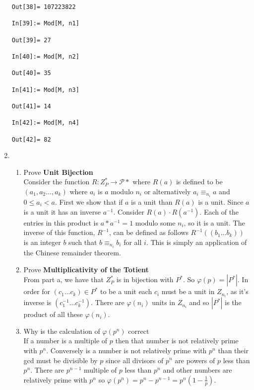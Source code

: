 \documentclass[12pt]{amsart}
\theoremstyle{definition}
\newcommand{\mc}[1]{\mathcal{#1}}
\begin{document}
\begin{enumerate}
\begin{verbatim}
Out[38]= 107223822

In[39]:= Mod[M, n1]

Out[39]= 27

In[40]:= Mod[M, n2]

Out[40]= 35

In[41]:= Mod[M, n3]

Out[41]= 14

In[42]:= Mod[M, n4]

Out[42]= 82
\end{verbatim}


\newpage %
\item 
\begin{enumerate}
\item Prove {\bfseries Unit Bijection}
\\

	Consider the function $R\colon Z_P^*\to \mc{P}*$ where $R(a)$ is defined to be $(a_1,a_2...,a_k)$ where $a_i$ is $a$ modulo $n_i$ or alternatively $a_i \equiv_{n_i} a$ and $0 \leq a_i < a$.
	First we show that if $a$ is a unit than $R(a)$ is a unit. Since $a$ is a unit it has an inverse $a^{-1}$. Consider $R(a)\cdot R(a^{-1})$. Each of the entries in this product is $a*a^{-1}=1$ modulo some $n_i$, so it is a unit. 
	The inverse of this function, $R^{-1}$, can be defined as follows $R^{-1}((b_1...b_k))$ is an integer $b$ such that $b \equiv_{n_i} b_i$ for all $i$. This is simply an application of the Chinese remainder theorem.    
\\
\item Prove {\bfseries Multiplicativity of the Totient}
\\
From part a, we have that $Z_P^*$ is in bijection with $P^*$. So $\varphi(p)=|P^*|$. In order for $(c_1...c_k) \in P^*$ to be a unit each $c_i$ must be a unit in $Z_{n_i}$, as it's inverse is $(c^{-1}_1...c^{-1}_k)$. There are $\varphi(n_i)$ units in $Z_{n_i}$ and so $|P^*|$ is the product of all these $\varphi(n_i)$.
\\
\item Why is the calculation of $\varphi(p^n)$ correct
\\
If a number is a multiple of $p$ then that number is not relatively prime with $p^n$. Conversely is a number is not relatively prime with $p^n$ than their gcd must be divisible by $p$ since all divisors of $p^n$ are powers of $p$ less than $p^n$. There are $p^{n-1}$ multiple of $p$ less than $p^n$ and other numbers are relatively prime with $p^n$ so $\varphi(p^n)=p^n-p^{n-1}=p^n(1-\frac{1}{p})$.
\\

\end{enumerate}
\end{enumerate}
\end{document}

